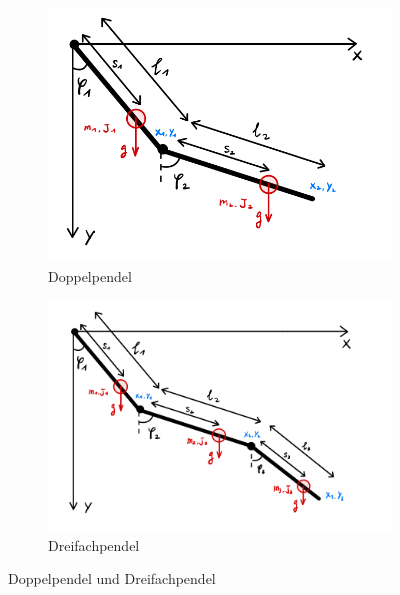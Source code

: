 \begin{figure}[H]
  \centering
  \begin{subfigure}{0.47\textwidth}
    \centering
    \includegraphics[width=\textwidth]{figures/Doppelpendel.png}
    \caption{Doppelpendel}
    \label{fig:Doppelpendel}
  \end{subfigure}
  \hfill 
  \begin{subfigure}{0.51\textwidth}
    \centering
    \includegraphics[width=\textwidth]{figures/Dreifachpendel.png}
    \caption{Dreifachpendel}
    \label{fig:Dreifachpendel}
  \end{subfigure}
  \caption{Doppelpendel und Dreifachpendel}
  \label{fig:Doppelpendel_Dreifachpendel}
\end{figure}





